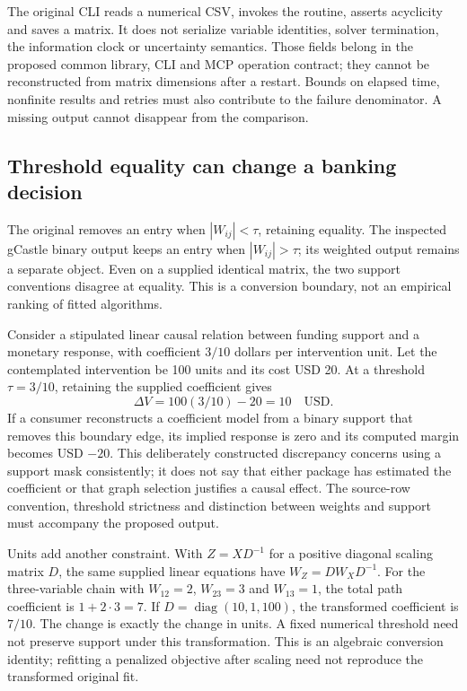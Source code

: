The original CLI reads a numerical CSV, invokes the routine, asserts
acyclicity and saves a matrix. It does not serialize variable identities,
solver termination, the information clock or uncertainty semantics. Those
fields belong in the proposed common library, CLI and MCP operation contract;
they cannot be reconstructed from matrix dimensions after a restart. Bounds on
elapsed time, nonfinite results and retries must also contribute to the failure
denominator. A missing output cannot disappear from the comparison.
\citep{exec23_notears_source}

\subsection{Threshold equality can change a banking decision}
\label{exec23:notears-threshold}
The original removes an entry when $|W_{ij}|<\tau$, retaining equality.
The inspected gCastle binary output keeps an entry when $|W_{ij}|>\tau$;
its weighted output remains a separate object. Even on a supplied identical
matrix, the two support conventions disagree at equality. This is a conversion
boundary, not an empirical ranking of fitted algorithms.
\citep{exec23_notears_source,exec20_gcastle_source}

Consider a stipulated linear causal relation between funding support and a
monetary response, with coefficient $3/10$ dollars per intervention unit.
Let the contemplated intervention be 100 units and its cost USD 20.
At a threshold $\tau=3/10$, retaining the supplied coefficient gives
\begin{equation}
 \Delta V=100(3/10)-20=10\quad\text{USD}.
 \label{exec23:notears-value}
\end{equation}
If a consumer reconstructs a coefficient model from a binary support that
removes this boundary edge, its implied response is zero and its computed
margin becomes USD $-20$. This deliberately constructed discrepancy concerns
using a support mask consistently; it does not say that either package has
estimated the coefficient or that graph selection justifies a causal effect.
The source-row convention, threshold strictness and distinction between
weights and support must accompany the proposed output.
\citep{exec23_notears_reference}

Units add another constraint. With $Z=XD^{-1}$ for a positive diagonal scaling
matrix $D$, the same supplied linear equations have $W_Z=DW_XD^{-1}$.
For the three-variable chain with $W_{12}=2$, $W_{23}=3$ and $W_{13}=1$,
the total path coefficient is $1+2\cdot3=7$.
If $D=\operatorname{diag}(10,1,100)$, the transformed coefficient is $7/10$.
The change is exactly the change in units. A fixed numerical threshold need
not preserve support under this transformation. This is an algebraic conversion
identity; refitting a penalized objective after scaling need not reproduce
the transformed original fit.\citep{exec23_notears_reference}

